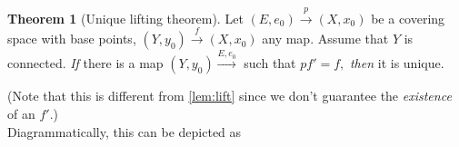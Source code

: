 \documentclass[12pt]{article}
\theoremstyle{definition}
\newtheorem{thm}{Theorem}
\numberwithin{thm}{section}
\begin{document}
\begin{thm}[Unique lifting theorem] \label{thm:uniquelift}
	Let $(E, e_0) \overset{p}{\longrightarrow} (X, x_0)$ be a covering space with base points, $(Y, y_0) \overset{f}{\longrightarrow} (X, x_0)$ any map. Assume that $Y$ is connected. \emph{If} there is a map $(Y, y_0) \overset{E, e_0}{\longrightarrow}$ such that $pf' = f,$ \emph{then} it is unique.
\end{thm}
(Note that this is different from \cref{lem:lift} since we don't guarantee the \emph{existence} of an $f'.$)\\
Diagrammatically, this can be depicted as
\begin{center}
\end{center}
\end{document}
